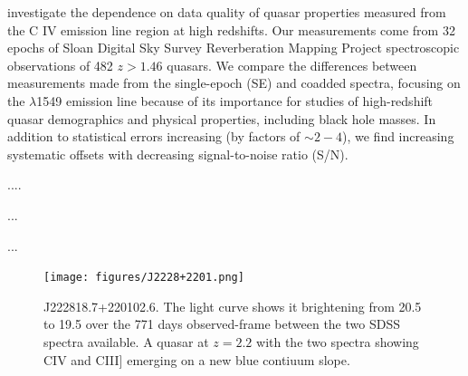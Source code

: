 \documentclass[a4paper,fleqn,usenatbib]{mnras}
\begin{document}



\citet{Denney2016}
investigate the dependence on data quality of quasar properties
measured from the C IV emission line region at high redshifts.  Our
measurements come from 32 epochs of Sloan Digital Sky Survey
Reverberation Mapping Project spectroscopic observations of 482 $z >
1.46$ quasars. We compare the differences between measurements made
from the single-epoch (SE) and coadded spectra, focusing on the \civ
$\lambda$1549 emission line because of its importance for studies of
high-redshift quasar demographics and physical properties, including
black hole masses. In addition to statistical errors increasing (by
factors of $\sim2-4$), we find increasing systematic offsets with
decreasing signal-to-noise ratio (S/N).

\citet{Grier2015}....

\citep{Corbin1991, Dimitrijevic1992, Wills1993, Brotherton1994, Osmer1994} ...

\citep{Nazarova2003} ...






\iffalse
\begin{figure}
  \centering
  \texttt{[image: figures/J2228+2201.png]}
  \vspace{-12pt}
  \caption[]{J222818.7+220102.6. 
The light curve shows it brightening from 20.5 to 19.5 over the 771 days observed-frame between the two SDSS spectra available. 
A quasar at $z = 2.2$ with the two spectra showing CIV and CIII] emerging on a new blue contiuum slope.}
  \label{fig:disk_suppression}
\end{figure}
\end{document}
